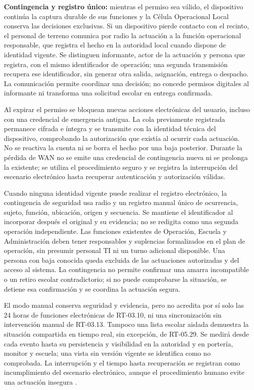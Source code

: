 \textbf{Contingencia y registro único:} mientras el permiso sea válido, el dispositivo continúa la captura durable de sus funciones y la Célula Operacional Local conserva las decisiones exclusivas. Si un dispositivo pierde contacto con el recinto, el personal de terreno comunica por radio la actuación a la función operacional responsable, que registra el hecho en la autoridad local cuando dispone de identidad vigente. Se distinguen informante, actor de la actuación y persona que registra, con el mismo identificador de operación; una segunda transmisión recupera ese identificador, sin generar otra salida, asignación, entrega o despacho. La comunicación permite coordinar una decisión; no concede permisos digitales al informante ni transforma una solicitud escolar en entrega confirmada.

Al expirar el permiso se bloquean nuevas acciones electrónicas del usuario, incluso con una credencial de emergencia antigua. La cola previamente registrada permanece cifrada e íntegra y se transmite con la identidad técnica del dispositivo, comprobando la autorización que existía al ocurrir cada actuación. No se reactiva la cuenta ni se borra el hecho por una baja posterior. Durante la pérdida de WAN no se emite una credencial de contingencia nueva ni se prolonga la existente; se utiliza el procedimiento seguro y se registra la interrupción del escenario electrónico hasta recuperar autenticación y autorización válidas.

Cuando ninguna identidad vigente puede realizar el registro electrónico, la contingencia de seguridad usa radio y un registro manual único de ocurrencia, sujeto, función, ubicación, origen y secuencia. Se mantiene el identificador al incorporar después el original y su evidencia; no se redigita como una segunda operación independiente. Las funciones existentes de Operación, Escuela y Administración deben tener responsables y suplencias formalizados en el plan de operación, sin presumir personal TI ni un turno adicional disponible. Una persona con baja conocida queda excluida de las actuaciones autorizadas y del acceso al sistema. La contingencia no permite confirmar una amarra incompatible o un retiro escolar contradictorio; si no puede comprobarse la situación, se detiene esa confirmación y se coordina la actuación segura.

El modo manual conserva seguridad y evidencia, pero no acredita por sí solo las 24 horas de funciones electrónicas de RT-03.10, ni una sincronización sin intervención manual de RT-03.13. Tampoco una lista escolar aislada demuestra la situación compartida en tiempo real, sin excepción, de RT-05.29. Se medirá desde cada evento hasta su persistencia y visibilidad en la autoridad y en portería, monitor y escuela; una vista sin versión vigente se identifica como no comprobada. La interrupción y el tiempo hasta recuperación se registran como incumplimiento del escenario electrónico, aunque el procedimiento humano evite una actuación insegura \parencite[cap.~15, RT-03.10/13 y RT-05.29]{caso07}.

